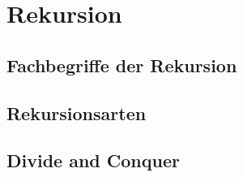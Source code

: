 \section{Rekursion}
\subsection{Fachbegriffe der Rekursion}
\subsection{Rekursionsarten}
\subsection{Divide and Conquer}